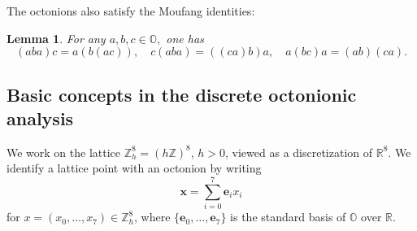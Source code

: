 \documentclass{amsart}
\newtheorem{lemma}[theorem]{Lemma}
\theoremstyle{definition}
\theoremstyle{remark}
\numberwithin{equation}{section}
\newcommand{\R}{\mathbb{R}}
\newcommand{\OO}{\mathbb O}
\newcommand{\Z}{\mathbb Z}
\newcommand{\e}{\bm{e}}
\begin{document}
The octonions also satisfy the Moufang identities:

 \begin{lemma}
    For any $a,b,c\in \OO,$ one has \begin{equation*}
       (aba)c= a(b(ac)), \quad  c(aba)=((ca)b)a, \quad  a(bc)a= (ab)(ca).
    \end{equation*}
 \end{lemma}









\subsection{Basic concepts in the discrete octonionic analysis}
We work on the lattice $\Z_h^8=(h\Z)^8$, $h>0$, viewed as a discretization of $\R^8$. We identify a lattice point with an octonion by writing
\[ \bm x = \sum_{i=0}^7 \e_i x_i \]
for $x=(x_0,\dots,x_7)\in\Z_h^8$, where $\{\e_0,\dots,\e_7\}$ is the standard basis of $\OO$ over $\R$.
\end{document}
